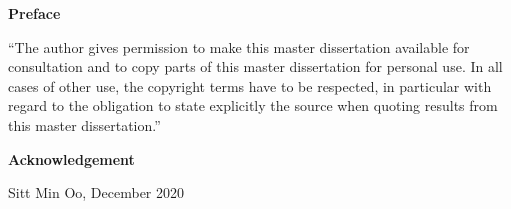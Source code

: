 
\newpage
{}
{}
\noindent \textbf{\huge Preface}

\vspace{1.5cm}

\noindent
``The author gives permission to make this master dissertation available for consultation and to copy parts
of this master dissertation for personal use. In all cases of other use, the copyright terms have to be respected,
in particular with regard to the obligation to state explicitly the source when quoting results from this master
dissertation.''

\vspace{1.5cm}

{}
\noindent \textbf{\huge Acknowledgement}



\addvspace{4cm}


\noindent Sitt Min Oo, December 2020
